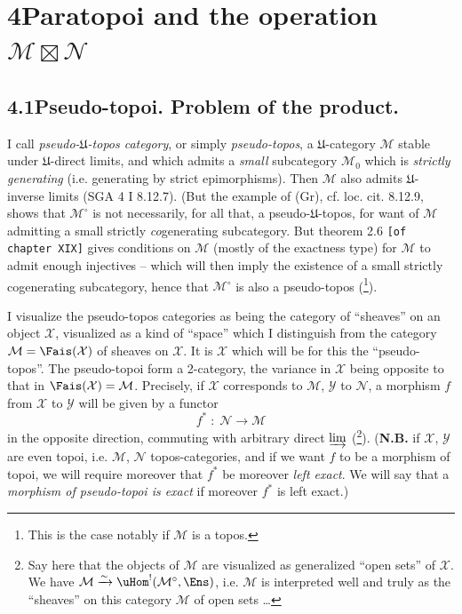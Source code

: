 

\section*{4\quad Paratopoi and the operation $\mathcal{M}\boxtimes\mathcal{N}$}

\subsection*{4.1\quad Pseudo-topoi. Problem of the product.}

I call \textit{pseudo-$\mathfrak{U}$-topos category}, or simply \textit{pseudo-topos}, a $\mathfrak{U}$-category $\mathcal{M}$ stable under $\mathfrak{U}$-direct limits, and which admits a \textit{small} subcategory $\mathcal{M}_0$ which is \textit{strictly generating} (i.e. generating by strict epimorphisms). Then $\mathcal{M}$ also admits $\mathfrak{U}$-inverse limits (SGA 4 I 8.12.7). (But the example of (Gr), cf. loc. cit. 8.12.9, shows that $\mathcal{M}^\circ$ is not necessarily, for all that, a pseudo-$\mathfrak{U}$-topos, for want of $\mathcal{M}$ admitting a small strictly \textit{co}generating subcategory. But theorem 2.6 \texttt{[of chapter XIX]} gives conditions on $\mathcal{M}$ (mostly of the exactness type) %
for $\mathcal{M}$ to admit enough injectives -- which will then imply the existence of a small strictly cogenerating subcategory, hence that $\mathcal{M}^\circ$ is also a pseudo-topos (\footnote{This is the case notably if $\mathcal{M}$ is a topos.}).

I visualize the pseudo-topos categories as being the category of ``sheaves'' on an object $\mathcal{X}$, visualized as a kind of ``space'' which I distinguish from the category $\mathcal{M}=\Fais(\mathcal{X})$ of sheaves on $\mathcal{X}$. It is $\mathcal{X}$ which will be for this the ``pseudo-topos''. The pseudo-topoi form a 2-category, the variance in $\mathcal{X}$ being opposite to that in $\Fais(\mathcal{X})=\mathcal{M}$. Precisely, if $\mathcal{X}$ corresponds to $\mathcal{M}$, $\mathcal{Y}$ to $\mathcal{N}$, a morphism $f$ from $\mathcal{X}$ to $\mathcal{Y}$ will be given by a functor
\[
f^* \;:\; \mathcal{N} \longrightarrow \mathcal{M}
\tag*{(4.1.1)}
\]
in the opposite direction, commuting with arbitrary direct $\varinjlim$ (\footnote{Say here that the objects of $\mathcal{M}$ are visualized as generalized ``open sets'' of $\mathcal{X}$. We have $\mathcal{M}\xrightarrow{\sim}\uHom^!(\mathcal{M}^\circ,\Ens)$, i.e. $\mathcal{M}$ is interpreted well and truly as the ``sheaves'' on this category $\mathcal{M}$ of open sets \ldots}). (\textbf{N.B.} if $\mathcal{X}$, $\mathcal{Y}$ are even topoi, i.e. $\mathcal{M}$, $\mathcal{N}$ topos-categories, and if we want $f$ to be a morphism of topoi, we will require moreover that $f^*$ be moreover \textit{left exact}. We will say that a \textit{morphism of pseudo-topoi is exact} if moreover $f^*$ is left exact.)

